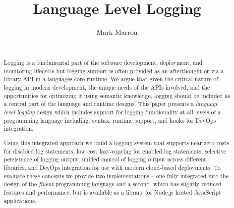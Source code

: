 \documentclass[preprint]{sig-alternate-05-2015}
\newcommand{\ourtitle}{Language Level Logging}
\begin{document}





\title{\ourtitle}

\author{
Mark Marron\\
       \\
}

\maketitle

\begin{abstract} 
Logging is a fundamental part of the software development, deployment, and
monitoring lifecycle but logging support is often provided as an afterthought or
via a library API in a languages core runtime. We argue that given the critical
nature of logging in modern development, the unique needs of the APIs involved,
and the opportunities for optimizing it using semantic knowledge, logging should
be included as a central part of the language and runtime designs. This paper
presents a \emph{language level logging} design which includes support for
logging functionality at all levels of a programming language including, syntax,
runtime support, and hooks for DevOps integration.

Using this integrated approach we build a logging system that supports near
zero-costs for disabled log statements, low cost lazy-copying for enabled log
statements, selective persistence of logging output, unified control of logging
output across different libraries, and DevOps integration for use with modern
cloud-based deployments. To evaluate these concepts we provide two
implementations -- one fully integrated into the design of the \emph{fluent}
programming language and a second, which has slightly reduced features and
performance, but is available as a library for Node.js hosted JavaScript
applications.
\end{abstract}

\end{document}
